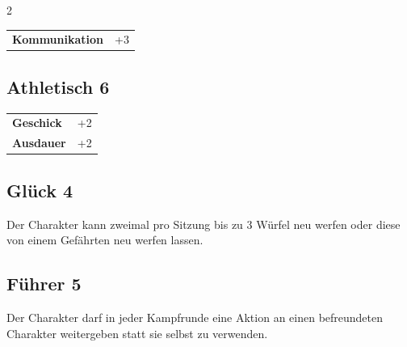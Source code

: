 \begin{multicols}{2}
\begin{tcolorbox}
\begin{tabular}{@{}ll@{}}
    \textbf{Kommunikation} & +3\\
\end{tabular}


\end{tcolorbox}

\begin{tcolorbox}
    \subsection*{Athletisch \hfill \small{6 }}
    \tcblower




\begin{tabular}{@{}ll@{}}
    \textbf{Geschick} & +2\\
    \textbf{Ausdauer} & +2\\
\end{tabular}


\end{tcolorbox}

\begin{tcolorbox}
    \subsection*{Glück \hfill \small{4 }}
    \tcblower
Der Charakter kann zweimal pro Sitzung bis zu 3 Würfel neu werfen oder diese von einem Gefährten neu werfen lassen.


\vspace{3mm}



\end{tcolorbox}

\begin{tcolorbox}
    \subsection*{Führer \hfill \small{5 }}
    \tcblower
Der Charakter darf in jeder Kampfrunde eine Aktion an einen befreundeten Charakter weitergeben statt sie selbst zu verwenden.



\end{tcolorbox}
\end{multicols}
